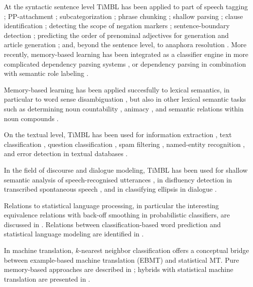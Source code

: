 \documentclass{report}
\begin{document}
At the syntactic sentence level TiMBL has been applied to part of
speech tagging \cite{Daelemans+96b,Zavrel+99,Halteren+01};
PP-attachment \cite{Zavrel+97b}; subcategorization \cite{Buchholz98};
phrase chunking \cite{Veenstra98,Sang+99}; shallow parsing
\cite{Daelemans+99a,Buchholz+99,Yeh00}; clause identification
\cite{Orasan00,Sang01}; detecting the scope of negation markers
\cite{Morante+08c}; sentence-boundary detection \cite{Stevenson+00};
predicting the order of prenominal adjectives for generation
\cite{Malouf00} and article generation \cite{Minnen+00}; and, beyond
the sentence level, to anaphora resolution
\cite{Preiss02,Mitkov+02,Hoste05}. More recently, memory-based
learning has been integrated as a classifier engine in more
complicated dependency parsing systems
\cite{Nivre+04,Sagae+05,Canisius+06b}, or dependency parsing in
combination with semantic role labeling \cite{Morante+09b}.

Memory-based learning has been applied succesfully to lexical
semantics, in particular to word sense disambiguation
\cite{Veenstra+00,Stevenson+99,Kokkinakis00,Mihalcea02,Hoste+02,DeCadt+04},
but also in other lexical semantic tasks such as determining noun
countability \cite{Baldwin+03}, animacy \cite{Orasan+01}, and semantic
relations within noun compounds \cite{Kim+06b,Nastase+06}.

On the textual level, TiMBL has been used for information extraction
\cite{Zavrel+00b,Zavrel+03,Ahn06}, text classification
\cite{Spitters00}, question classification \cite{Garcia+06,Dridan+07},
spam filtering \cite{Androutsopoulos+00}, named-entity recognition
\cite{Buchholz+00,Hendrickx+03,DeMeulder+03,Sporleder+06b,Leveling+06},
and error detection in textual databases \cite{Sporleder+06}.

In the field of discourse and dialogue modeling, TiMBL has been used
for shallow semantic analysis of speech-recognised utterances
\cite{Gustafson+99,Krahmer+01,VandenBosch+01,Lendvai+02a,Lendvai+03},
in disfluency detection in transcribed spontaneous speech
\cite{Lendvai+03c}, and in classifying ellipsis in dialogue
\cite{Fernandez+04}.

Relations to statistical language processing, in particular the
interesting equivalence relations with back-off smoothing in
probabilistic classifiers, are discussed in
\cite{Zavrel+97}. Relations between classification-based word
prediction and statistical language modeling are identified in
\cite{VandenBosch05,VandenBosch06}.

In machine translation, $k$-nearest neighbor classification offers a
conceptual bridge between example-based machine translation (EBMT) and
statistical MT. Pure memory-based approaches are described in
\cite{VandenBosch+07,Canisius+09,VandenBosch+09,VanGompel+09}; hybrids
with statistical machine translation are presented in
\cite{Stroppa+07,Haque+09}.
\end{document}
